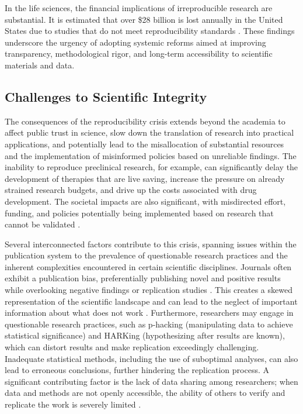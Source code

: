 \documentclass[final]{rc-book-2.14}
\begin{document}
In the life sciences, the financial implications of irreproducible research are substantial. It is estimated that over \$28 billion is lost annually in the United States due to studies that do not meet reproducibility standards \cite{freedman2015economics}. These findings underscore the urgency of adopting systemic reforms aimed at improving transparency, methodological rigor, and long-term accessibility to scientific materials and data.


\subsection{Challenges to Scientific Integrity}

The consequences of the reproducibility crisis extends beyond the academia to affect public trust in science, slow down the translation of research into practical applications, and potentially lead to the misallocation of substantial resources and the implementation of misinformed policies based on unreliable findings. The inability to reproduce preclinical research, for example, can significantly delay the development of therapies that are live saving, increase the pressure on already strained research budgets, and drive up the costs associated with drug development. The societal impacts are also significant, with misdirected effort, funding, and policies potentially being implemented based on research that cannot be validated \cite{freedman2015economics}.

Several interconnected factors contribute to this crisis, spanning issues within the publication system to the prevalence of questionable research practices and the inherent complexities encountered in certain scientific disciplines. Journals often exhibit a publication bias, preferentially publishing novel and positive results while overlooking negative findings or replication studies \cite{ioannidis2005most}. This creates a skewed representation of the scientific landscape and can lead to the neglect of important information about what does not work \cite{collins_policy_2014}. Furthermore, researchers may engage in questionable research practices, such as p-hacking (manipulating data to achieve statistical significance) and HARKing (hypothesizing after results are known), which can distort results and make replication exceedingly challenging. Inadequate statistical methods, including the use of suboptimal analyses, can also lead to erroneous conclusions, further hindering the replication process. A significant contributing factor is the lack of data sharing among researchers; when data and methods are not openly accessible, the ability of others to verify and replicate the work is severely limited \cite{munafo_manifesto_2017}.
\end{document}
